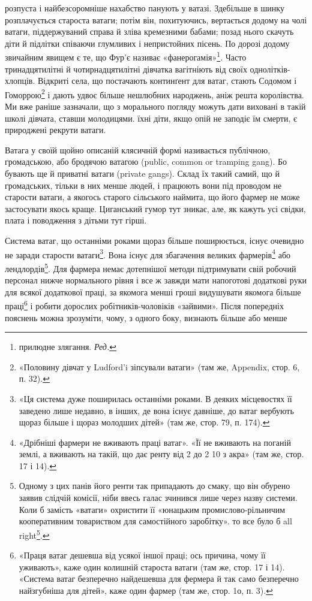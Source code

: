 \parcont{}  %
розпуста і найбезсоромніше нахабство панують у ватазі. Здебільше
в шинку розплачується староста ватаги; потім він, похитуючись,
вертається додому на чолі ватаги, піддержуваний справа
й зліва кремезними бабами; позад нього скачуть діти й підлітки
співаючи глумливих і непристойних пісень. По дорозі додому звичайним
явищем є те, що Фур’є називає «фанерогамія»\footnote*{
прилюдне злягання. \emph{Ред.}
}. Часто тринадцятилітні
й чотирнадцятилітні дівчатка вагітніють від своїх
однолітків-хлопців. Відкриті села, що постачають континґент
для ватаг, стають Содомом і Гоморрою\footnote{
«Половину дівчат у Ludford’i зіпсували ватаги» (там же, Appendix,
стор. 6, п. 32).
} і дають удвоє більше
нешлюбних народжень, аніж решта королівства. Ми вже раніше
зазначали, що з морального погляду можуть дати виховані в
такій школі дівчата, ставши молодицями. їхні діти, якщо опій
не заподіє їм смерти, є природжені рекрути ватаги.

Ватага у своїй щойно описаній клясичній формі називається
публічною, громадською, або бродячою ватагою (public, common
or tramping gang). Бо бувають ще й приватні ватаги (private
gangs). Склад їх такий самий, що й громадських, тільки в них
менше людей, і працюють вони під проводом не старости ватаги,
а якогось старого сільського наймита, що його фармер не може
застосувати якось краще. Циганський гумор тут зникає, але, як
кажуть усі свідки, плата і поводження з дітьми тут гірші.

Система ватаг, що останніми роками щораз більше поширюється,
існує очевидно не заради старости ватаги\footnote{
«Ця система дуже поширилась останніми роками. В деяких місцевостях
її заведено лише недавно, в інших, де вона існує давніше, до ватаг
вербують щораз більше і щораз молодших дітей» (там же, стор. 79,
п. 174).
}. Вона існує
для збагачення великих фармерів\footnote{
«Дрібніші фармери не вживають праці ватаг». «Її не вживають
на поганій землі, а вживають на такій, що дає ренту від 2
до 2 10 з акра» (там же, стор. 17 і 14).
} або лендлордів\footnote{
Одному з цих панів його ренти так припадають до смаку, що він
обурено заявив слідчій комісії, ніби ввесь галас зчинився лише через
назву системи. Коли б замість «ватаги» охристити її «юнацьким промислово-рільничим
кооперативним товариством для самостійного заробітку».
то все було б all right\footnote*{
гаразд. \emph{Ред.}
}.
}. Для фармера
немає дотепнішої методи підтримувати свій робочий персонал
нижче нормального рівня і все ж завжди мати напоготові
додаткові руки для всякої додаткової праці, за якомога менші
гроші видушувати якомога більше праці\footnote{
«Праця ватаг дешевша від усякої іншої праці; ось причина, чому
її уживають», каже один колишній староста ватаги (там же, стор. 17
і 14). «Система ватаг безперечно найдешевша для фермера й так само
безперечно найзгубніша для дітей», каже один фармер (там же, стор. 1о,
п. 3).
} і робити дорослих
робітників-чоловіків «зайвими». Після попередніх пояснень
можна зрозуміти, чому, з одного боку, визнають більше або менше
\parbreak{}  %
